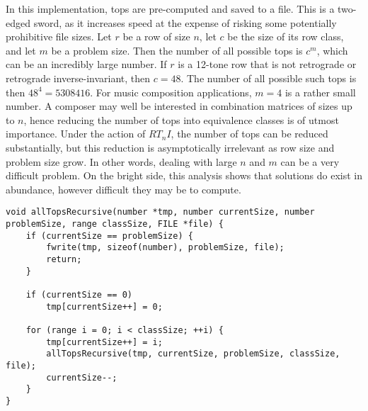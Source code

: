In this implementation, tops are pre-computed and saved to a file. This is a two-edged sword, as it increases speed at the expense of risking some potentially prohibitive file sizes. Let $r$ be a row of size $n$, let $c$ be the size of its row class, and let $m$ be a problem size. Then the number of all possible tops is $c^m$, which can be an incredibly large number. If $r$ is a 12-tone row that is not retrograde or retrograde inverse-invariant, then $c = 48$. The number of all possible such tops is then $48^4 = 5308416$. For music composition applications, $m = 4$ is a rather small number. A composer may well be interested in combination matrices of sizes up to $n$, hence reducing the number of tops into equivalence classes is of utmost importance. Under the action of $RT_nI$, the number of tops can be reduced substantially, but this reduction is asymptotically irrelevant as row size and problem size grow. In other words, dealing with large $n$ and $m$ can be a very difficult problem. On the bright side, this analysis shows that solutions do exist in abundance, however difficult they may be to compute.

\begin{lstlisting}[caption={Recursively computing all top vectors of a certain size.},label={allTopsRecursive}]
void allTopsRecursive(number *tmp, number currentSize, number problemSize, range classSize, FILE *file) {
    if (currentSize == problemSize) {
        fwrite(tmp, sizeof(number), problemSize, file);
        return;
    }

    if (currentSize == 0)
        tmp[currentSize++] = 0;

    for (range i = 0; i < classSize; ++i) {
        tmp[currentSize++] = i;
        allTopsRecursive(tmp, currentSize, problemSize, classSize, file);
        currentSize--;
    }
}
\end{lstlisting}


